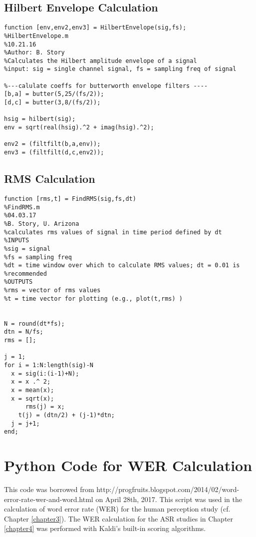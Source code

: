 \subsection{Hilbert Envelope Calculation}

\begin{lstlisting}
function [env,env2,env3] = HilbertEnvelope(sig,fs);
%HilbertEnvelope.m
%10.21.16
%Author: B. Story
%Calculates the Hilbert amplitude envelope of a signal
%input: sig = single channel signal, fs = sampling freq of signal

%---calulate coeffs for butterworth envelope filters ----
[b,a] = butter(5,25/(fs/2));
[d,c] = butter(3,8/(fs/2));

hsig = hilbert(sig);
env = sqrt(real(hsig).^2 + imag(hsig).^2);

env2 = (filtfilt(b,a,env));
env3 = (filtfilt(d,c,env2));
\end{lstlisting}


\subsection{RMS Calculation}

\begin{lstlisting}
function [rms,t] = FindRMS(sig,fs,dt)
%FindRMS.m
%04.03.17
%B. Story, U. Arizona
%calculates rms values of signal in time period defined by dt
%INPUTS
%sig = signal
%fs = sampling freq
%dt = time window over which to calculate RMS values; dt = 0.01 is
%recommended
%OUTPUTS
%rms = vector of rms values
%t = time vector for plotting (e.g., plot(t,rms) )


N = round(dt*fs);
dtn = N/fs;
rms = [];

j = 1;
for i = 1:N:length(sig)-N
  x = sig(i:(i-1)+N);
  x = x .^ 2;
  x = mean(x);
  x = sqrt(x);
      rms(j) = x;
    t(j) = (dtn/2) + (j-1)*dtn;
  j = j+1;
end;
\end{lstlisting}


\section{Python Code for WER Calculation}\label{python-code}

This code was borrowed from http://progfruits.blogspot.com/2014/02/word-error-rate-wer-and-word.html on April 28th, 2017.  This script was used in the calculation of word error rate (WER) for the human perception study (cf. Chapter \ref{chapter3}).  The WER calculation for the ASR studies in Chapter \ref{chapter4} was performed with Kaldi's built-in scoring algorithms.

